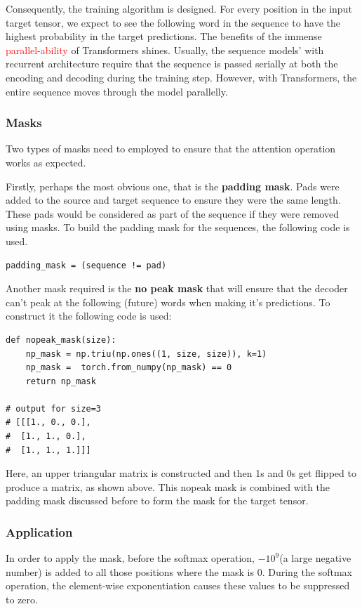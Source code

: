 \documentclass[12pt,a4paper,twoside,openright]{report}
\newcommand{\red}[1]{\textcolor{red}{#1}}
\begin{document}
Consequently, the training algorithm is designed. For every position in the input target tensor, we expect to see the following word in the sequence to have the highest probability in the target predictions. The benefits of the immense \red{parallel-ability} of Transformers shines. Usually, the sequence models' with recurrent architecture require that the sequence is passed serially at both the encoding and decoding during the training step. However, with Transformers, the entire sequence moves through the model parallelly. 

\subsubsection{Masks}
Two types of masks need to employed to ensure that the attention operation works as expected. 

Firstly, perhaps the most obvious one, that is the \textbf{padding mask}. Pads were added to the source and target sequence to ensure they were the same length. These pads would be considered as part of the sequence if they were removed using masks. To build the padding mask for the sequences, the following code is used. 
\begin{lstlisting}[label=padding-code]
    padding_mask = (sequence != pad)
\end{lstlisting}

Another mask required is the \textbf{no peak mask} that will ensure that the decoder can't peak at the following (future) words when making it's predictions. To construct it the following code is used:
\begin{lstlisting}[label=nopeak-mask-code,caption=No Peak Mask generator]
def nopeak_mask(size):
    np_mask = np.triu(np.ones((1, size, size)), k=1)
    np_mask =  torch.from_numpy(np_mask) == 0
    return np_mask
    
# output for size=3
# [[[1., 0., 0.],
#  [1., 1., 0.],
#  [1., 1., 1.]]]
\end{lstlisting}

Here, an upper triangular matrix is constructed and then 1s and 0s get flipped to produce a matrix, as shown above. This nopeak mask is combined with the padding mask discussed before to form the mask for the target tensor. 

\subsubsection{Application}
In order to apply the mask, before the softmax operation, $-10^9$(a large negative number) is added to all those positions where the mask is 0. During the softmax operation, the element-wise exponentiation causes these values to be suppressed to zero. 
\end{document}
